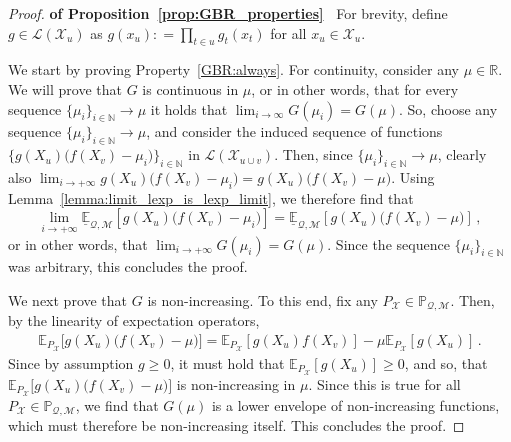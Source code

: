 \documentclass[3p]{elsarticle}
\newcommand{\nats}{\mathbb{N}}
\newcommand{\reals}{\mathbb{R}}
\newcommand{\states}{\mathcal{X}}
\newcommand{\lexp}{\underline{\mathbb{E}}_{\rateset,\mathcal{M}}}
\newcommand{\gambles}{\mathcal{L}}
\newcommand{\rateset}{\mathcal{Q}}
\newcommand{\coloneqq}{:\!=}
\begin{document}
\begin{proof}{\bf of Proposition~\ref{prop:GBR_properties}~}
For brevity, define $g\in\gambles(\states_u)$ as $g(x_u)\coloneqq \prod_{t\in u} g_{t}(x_{t})$ for all $x_u\in\states_u$.

We start by proving Property~\ref{GBR:always}. For continuity, consider any $\mu\in\reals$. We will prove that $G$ is continuous in $\mu$, or in other words, that for every sequence $\{\mu_i\}_{i\in\nats}\to\mu$ it holds that $\lim_{i\to\infty}G(\mu_i)=G(\mu)$. So, choose any sequence $\{\mu_i\}_{i\in\nats}\to\mu$, and consider the induced sequence of functions $\bigl\{g(X_u)\bigl(f(X_v) - \mu_i\bigr)\bigr\}_{i\in\nats}$ in $\gambles(\states_{u\cup v})$. Then, since $\{\mu_i\}_{i\in\nats}\to\mu$, clearly also $\lim_{i\to+\infty}g(X_u)\bigl(f(X_v) - \mu_i\bigr)=g(X_u)\bigl(f(X_v) - \mu\bigr)$. Using Lemma~\ref{lemma:limit_lexp_is_lexp_limit}, we therefore find that
\begin{equation*}
\lim_{i\to+\infty}\lexp[g(X_u)\bigl(f(X_v) - \mu_i\bigr)] = \lexp[g(X_u)\bigl(f(X_v) - \mu\bigr)]\,,
\end{equation*}
or in other words, that $\lim_{i\to+\infty}G(\mu_i) = G(\mu)$. Since the sequence $\{\mu_i\}_{i\in\nats}$ was arbitrary, this concludes the proof.

We next prove that $G$ is non-increasing. To this end, fix any $P_\states\in\mathbb{P}_{\rateset,\mathcal{M}}$. Then, by the linearity of expectation operators,
\begin{align}\label{eq:gbr_linear_expansion}
\mathbb{E}_{P_\states}\bigl[g(X_u)\bigl(f(X_v) - \mu\bigr)\bigr] = \mathbb{E}_{P_\states}[g(X_u)f(X_v)] - \mu\mathbb{E}_{P_\states}[g(X_u)]\,.
\end{align}
Since by assumption $g\geq 0$, it must hold that $\mathbb{E}_{P_\states}[g(X_u)]\geq 0$, and so, that $\mathbb{E}_{P_\states}\bigl[g(X_u)\bigl(f(X_v) - \mu\bigr)\bigr]$ is non-increasing in $\mu$. Since this is true for all ${P_\states}\in\mathbb{P}_{\rateset,\mathcal{M}}$, we find that $G(\mu)$ is a lower envelope of non-increasing functions, which must therefore be non-increasing itself. This concludes the proof.


\end{proof}
\end{document}
